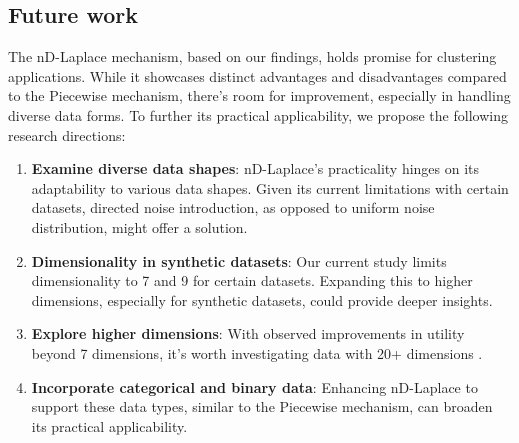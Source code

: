\subsection{Future work}
The nD-Laplace mechanism, based on our findings, holds promise for clustering applications. While it showcases distinct advantages and disadvantages compared to the Piecewise mechanism, there's room for improvement, especially in handling diverse data forms. To further its practical applicability, we propose the following research directions:

\begin{enumerate}
\item \textbf{Examine diverse data shapes}: nD-Laplace's practicality hinges on its adaptability to various data shapes. Given its current limitations with certain datasets, directed noise introduction, as opposed to uniform noise distribution, might offer a solution.
\item \textbf{Dimensionality in synthetic datasets}: Our current study limits dimensionality to 7 and 9 for certain datasets. Expanding this to higher dimensions, especially for synthetic datasets, could provide deeper insights.
\item \textbf{Explore higher dimensions}: With observed improvements in utility beyond 7 dimensions, it's worth investigating data with 20+ dimensions .
\item \textbf{Incorporate categorical and binary data}: Enhancing nD-Laplace to support these data types, similar to the Piecewise mechanism, can broaden its practical applicability. 
\end{enumerate}

